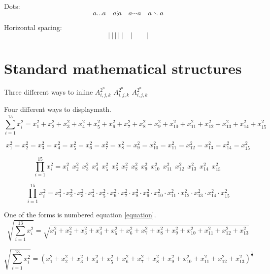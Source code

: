 Dots:
\begin{equation}
a \ldots a \quad a \vdots a \quad  a \cdots a \quad  a \ddots a
\end{equation}

Horizontal spacing:
\begin{equation}
|~|\,|\:|\;|\quad | \qquad |
\end{equation}%

\section{Standard mathematical structures}

Three different ways to inline \begin{math}A_{i,j,k}^{2^n}\end{math} \(A_{i,j,k}^{2^n}\) \(A_{i,j,k}^{2^n}\)

Four different ways to displaymath.
\setcounter{equation}{99}
\begin{equation}\label{equation}
\sum_{i=1}^{15} x_i^2 = x_1^2 + x_2^2 + x_3^2 + x_4^2 + x_5^2 + x_6^2 + x_7^2 + x_8^2 + x_9^2 + x_{10}^2 + x_{11}^2 + x_{12}^2 + x_{13}^2 + x_{14}^2 + x_{15}^2 
\end{equation}

\begin{displaymath}
x_1^2 = x_2^2 = x_3^2 = x_4^2 = x_5^2 = x_6^2 = x_7^2 = x_8^2 = x_9^2 = x_{10}^2 = x_{11}^2 = x_{12}^2 = x_{13}^2 = x_{14}^2 = x_{15}^2 
\end{displaymath}

\[
\prod_{i=1}^{15} x_i^2 = x_1^2\ \ x_2^2\ \ x_3^2\ \ x_4^2\ \ x_5^2\ \ x_6^2\ \ x_7^2\ \ x_8^2\ \ x_9^2\ \ x_{10}^2\ \ x_{11}^2\ \ x_{12}^2\ \ x_{13}^2\ \ x_{14}^2\ \ x_{15}^2\ 
\]

\[
\prod_{i=1}^{15} x_i^2 = x_1^2 \cdot x_2^2 \cdot x_3^2 \cdot x_4^2 \cdot x_5^2 \cdot x_6^2 \cdot x_7^2 \cdot x_8^2 \cdot x_9^2 \cdot x_{10}^2 \cdot x_{11}^2 \cdot x_{12}^2 \cdot x_{13}^2 \cdot x_{14}^2 \cdot x_{15}^2 
\]

One of the forms is numbered equation \ref{equation}.
\[
\sqrt{\sum_{i=1}^{13} x_i^2} = \sqrt{x_1^2 + x_2^2 + x_3^2 + x_4^2 + x_5^2 + x_6^2 + x_7^2 + x_8^2 + x_9^2 + x_{10}^2+ x_{11}^2 + x_{12}^2 + x_{13}^2 }
\]

\[
\sqrt{\sum_{i=1}^{13} x_i^2} = \left(x_1^2 + x_2^2 + x_3^2 + x_4^2 + x_5^2 + x_6^2 + x_7^2 + x_8^2 + x_9^2 + x_{10}^2+ x_{11}^2 + x_{12}^2 + x_{13}^2 \right)^{\frac{1}{2}}
\]

